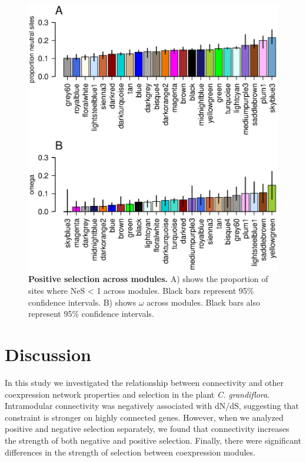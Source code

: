 \begin{figure}[ht!]
\centering
\includegraphics[width=\linewidth]{Ch4Fig4}
\caption{\textbf{Positive selection across modules.} A) shows the proportion of sites where NeS < 1 across modules. Black bars represent 95\% confidence intervals. B) shows $\omega$ across modules. Black bars also represent 95\% confidence intervals.
}
\label{fig:f4}
\end{figure}


\section{Discussion}

In this study we investigated the relationship between connectivity and other coexpression network properties and selection in the plant \textit{C. grandiflora}. Intramodular connectivity was negatively associated with dN/dS, suggesting that constraint is stronger on highly connected genes. However, when we analyzed positive and negative selection separately, we found that connectivity increases the strength of both negative and positive selection. Finally, there were significant differences in the strength of selection between coexpression modules.

